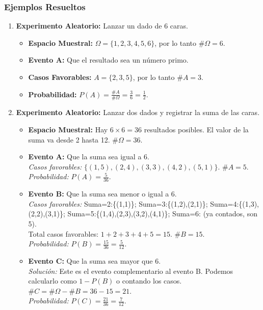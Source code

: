 \documentclass[12pt, letterpaper]{article}
\begin{document}
\subsubsection{Ejemplos Resueltos}
\begin{enumerate}
	\item \textbf{Experimento Aleatorio:} Lanzar un dado de 6 caras.
	      \begin{itemize}
		      \item \textbf{Espacio Muestral:} $\Omega = \{1, 2, 3, 4, 5, 6\}$, por lo tanto $\#\Omega = 6$.
		      \item \textbf{Evento A:} Que el resultado sea un número primo.
		      \item \textbf{Casos Favorables:} $A = \{2, 3, 5\}$, por lo tanto $\#A = 3$.
		      \item \textbf{Probabilidad:} $P(A) = \frac{\#A}{\#\Omega} = \frac{3}{6} = \frac{1}{2}$.
	      \end{itemize}

	\item \textbf{Experimento Aleatorio:} Lanzar dos dados y registrar la suma de las caras.
	      \begin{itemize}
		      \item \textbf{Espacio Muestral:} Hay $6 \times 6 = 36$ resultados posibles. El valor de la suma va desde 2 hasta 12. $\#\Omega = 36$.
		      \item \textbf{Evento A:} Que la suma sea igual a 6. \\
		            \textit{Casos favorables:} $\{(1,5), (2,4), (3,3), (4,2), (5,1)\}$. $\#A=5$. \\
		            \textit{Probabilidad:} $P(A) = \frac{5}{36}$.
		      \item \textbf{Evento B:} Que la suma sea menor o igual a 6. \\
		            \textit{Casos favorables:} Suma=2:\{(1,1)\}; Suma=3:\{(1,2),(2,1)\}; Suma=4:\{(1,3),(2,2),(3,1)\}; Suma=5:\{(1,4),(2,3),(3,2),(4,1)\}; Suma=6: (ya contados, son 5). \\
		            Total casos favorables: $1+2+3+4+5=15$. $\#B=15$. \\
		            \textit{Probabilidad:} $P(B) = \frac{15}{36} = \frac{5}{12}$.
		      \item \textbf{Evento C:} Que la suma sea mayor que 6. \\
		            \textit{Solución:} Este es el evento complementario al evento B. Podemos calcularlo como $1 - P(B)$ o contando los casos.
		            $\#C = \#\Omega - \#B = 36 - 15 = 21$. \\
		            \textit{Probabilidad:} $P(C) = \frac{21}{36} = \frac{7}{12}$.
	      \end{itemize}
\end{enumerate}
\newpage
\end{document}

